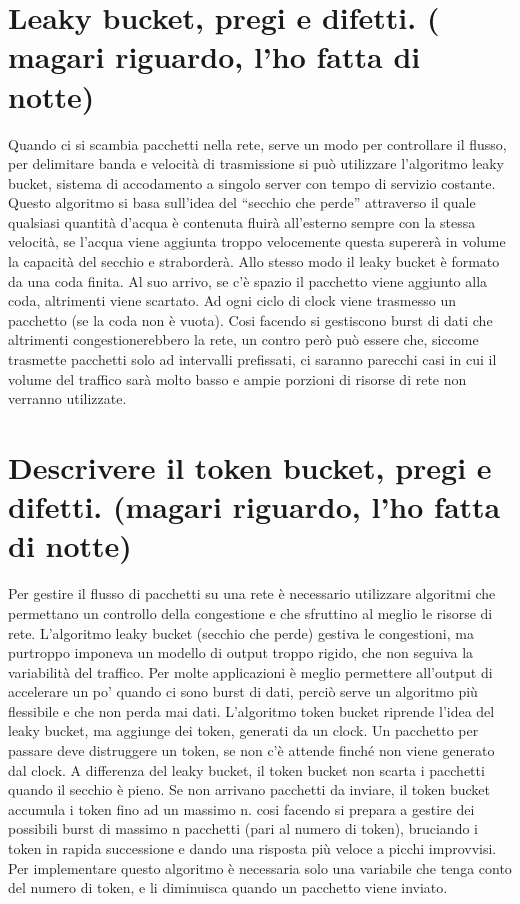 \section{Leaky bucket, pregi e difetti. ( magari riguardo, l’ho fatta di notte)}


Quando ci si scambia pacchetti nella rete, serve un modo per controllare il flusso, per delimitare banda e velocità di trasmissione si può utilizzare l’algoritmo leaky bucket, sistema di accodamento a singolo server con tempo di servizio costante.
Questo algoritmo si basa sull’idea del “secchio che perde” attraverso il quale qualsiasi quantità d’acqua è contenuta fluirà all’esterno sempre con la stessa velocità, se l’acqua viene aggiunta troppo velocemente questa supererà in volume la capacità del secchio e straborderà.
Allo stesso modo il leaky bucket è formato da una coda finita. Al suo arrivo, se c’è spazio il pacchetto viene aggiunto alla coda, altrimenti viene scartato. Ad ogni ciclo di clock viene trasmesso un pacchetto (se la coda non è vuota).
Cosi facendo si gestiscono burst di dati che altrimenti congestionerebbero la rete, un contro però può essere che, siccome trasmette pacchetti solo ad intervalli prefissati, ci saranno parecchi casi in cui il volume del traffico sarà molto basso e ampie porzioni di risorse di rete non verranno utilizzate.



 

\section{Descrivere il token bucket, pregi e difetti. (magari riguardo, l’ho fatta di notte)}

Per gestire il flusso di pacchetti su una rete è necessario utilizzare algoritmi che permettano un controllo della congestione e che sfruttino al meglio le risorse di rete. L’algoritmo leaky bucket (secchio che perde) gestiva le congestioni, ma purtroppo imponeva un modello di output troppo rigido, che non seguiva la variabilità del traffico.
Per molte applicazioni è meglio permettere all’output di accelerare un po’ quando ci sono burst di dati, perciò serve un algoritmo più flessibile e che non perda mai dati.
L’algoritmo token bucket riprende l’idea del leaky bucket, ma aggiunge dei token, generati da un clock.
Un pacchetto per passare deve distruggere un token, se non c’è attende finché non viene generato dal clock. A differenza del leaky bucket, il token bucket non scarta i pacchetti quando il secchio è pieno.
Se non arrivano pacchetti da inviare, il token bucket accumula i token fino ad un massimo n. cosi facendo si prepara a gestire dei possibili burst di massimo n pacchetti (pari al numero di token), bruciando i token in rapida successione e dando una risposta più veloce a picchi improvvisi.
Per implementare questo algoritmo è necessaria solo una variabile che tenga conto del numero di token, e li diminuisca quando un pacchetto viene inviato.
 
